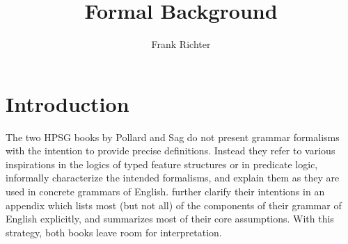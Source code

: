 \documentclass[output=paper
                ,modfonts
                ,nonflat
	        ,collection
	        ,collectionchapter
	        ,collectiontoclongg
 	        ,biblatex
                ,babelshorthands
                ,newtxmath
                ,draftmode
                ,colorlinks, citecolor=brown
]{./langsci/langscibook}
\author{%
 Frank Richter\affiliation{Goethe Universität Frankfurt}%
}
\title{Formal Background}
\begin{document}
\maketitle
\label{chap-formal-background}

{

\section{Introduction}
\label{sec-introduction}

The two HPSG books by Pollard and Sag
\citep{PollardSag1987,PollardSag1994} do not present grammar formalisms
with the intention to provide precise definitions.
Instead they refer to various inspirations in the
logics of typed feature structures or in predicate logic, informally
characterize the intended formalisms, and explain them as they are
used in concrete grammars of English. \citet{PollardSag1994} further clarify
their intentions in an appendix which lists most (but not all) of the components
of their grammar of English explicitly, and summarizes most of their core
assumptions. With this strategy, both books leave room for
interpretation.

}
\end{document}
